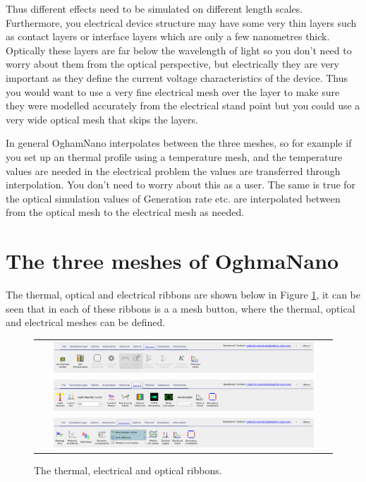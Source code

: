 Thus different effects need to be simulated on different length scales. Furthermore, you electrical device structure may have some very thin layers such as contact layers or interface layers which are only a few nanometres thick. Optically these layers are far below the wavelength of light so you don't need to worry about them from the optical perspective, but electrically they are very important as they define the current voltage characteristics of the device. Thus you would want to use a very fine electrical mesh over the layer to make sure they were modelled accurately from the electrical stand point but you could use a very wide optical mesh that skips the layers. 

In general OghamNano interpolates between the three meshes, so for example if you set up an thermal profile using a temperature mesh, and the temperature values are needed in the electrical problem the values are transferred through interpolation. You don't need to worry about this as a user. The same is true for the optical simulation values of Generation rate etc. are interpolated between from the optical mesh to the electrical mesh as needed.

\section{The three meshes of OghmaNano}
The thermal, optical and electrical ribbons are shown below in Figure \ref{tab:mesh_ribbons},  it can be seen that in each of these ribbons is a a mesh button, where the thermal, optical and electrical meshes can be defined.

\begin{figure}[H]
\centering
\begin{tabular}{ c }
\includegraphics[width=0.9\textwidth,height=0.1\textwidth]{./images/mesh/mesh_0.png}  \\
\includegraphics[width=0.9\textwidth,height=0.1\textwidth]{./images/mesh/mesh_1.png}  \\
\includegraphics[width=0.9\textwidth,height=0.1\textwidth]{./images/mesh/mesh_2.png}  \\
\end{tabular}
\caption{The thermal, electrical and optical ribbons.}
\label{tab:mesh_ribbons}
\end{figure}


